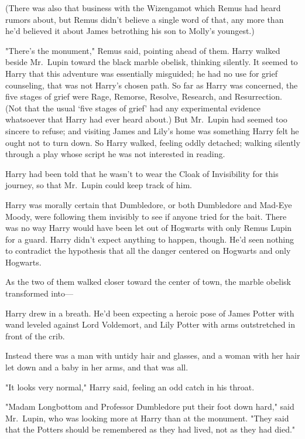 (There was also that business with the Wizengamot which Remus had heard rumors
about, but Remus didn't believe a single word of that, any more than he'd
believed it about James betrothing his son to Molly's youngest.)

"There's the monument," Remus said, pointing ahead of them.
\sbreak
Harry walked beside Mr.~Lupin toward the black marble obelisk, thinking
silently. It seemed to Harry that this adventure was essentially misguided; he
had no use for grief counseling, that was not Harry's chosen path. So far as
Harry was concerned, the five stages of grief were Rage, Remorse, Resolve,
Research, and Resurrection. (Not that the usual `five stages of grief' had any
experimental evidence whatsoever that Harry had ever heard about.) But
Mr.~Lupin had seemed too sincere to refuse; and visiting James and Lily's home
was something Harry felt he ought not to turn down. So Harry walked, feeling
oddly detached; walking silently through a play whose script he was not
interested in reading.

Harry had been told that he wasn't to wear the Cloak of Invisibility for this
journey, so that Mr.~Lupin could keep track of him.

Harry was morally certain that Dumbledore, or both Dumbledore and Mad-Eye
Moody, were following them invisibly to see if anyone tried for the bait. There
was no way Harry would have been let out of Hogwarts with only Remus Lupin for
a guard. Harry didn't expect anything to happen, though. He'd seen nothing to
contradict the hypothesis that all the danger centered on Hogwarts and only
Hogwarts.

As the two of them walked closer toward the center of town, the marble obelisk
transformed into—

Harry drew in a breath. He'd been expecting a heroic pose of James Potter with
wand leveled against Lord Voldemort, and Lily Potter with arms outstretched in
front of the crib.

Instead there was a man with untidy hair and glasses, and a woman with her hair
let down and a baby in her arms, and that was all.

"It looks very{\el} normal," Harry said, feeling an odd catch in his throat.

"Madam Longbottom and Professor Dumbledore put their foot down hard," said
Mr.~Lupin, who was looking more at Harry than at the monument. "They said that
the Potters should be remembered as they had lived, not as they had died."

